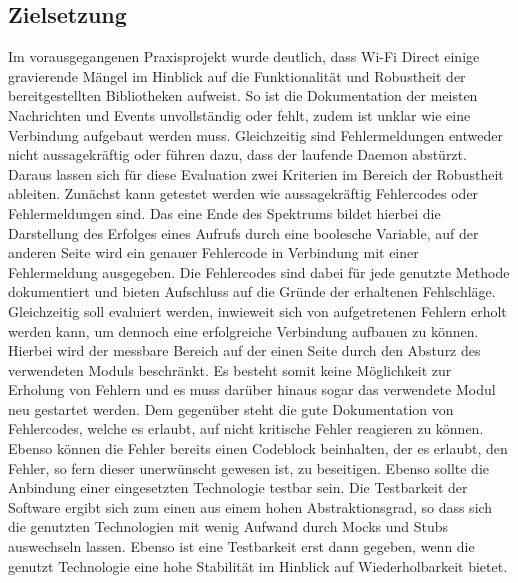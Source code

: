         \subsection{Zielsetzung}
        Im vorausgegangenen Praxisprojekt wurde deutlich, dass Wi-Fi Direct einige \linebreak gravierende Mängel im Hinblick auf die Funktionalität und Robustheit der bereitgestellten Bibliotheken aufweist. So ist die Dokumentation der meisten Nachrichten und Events unvollständig oder fehlt, zudem ist unklar wie eine Verbindung aufgebaut werden muss. Gleichzeitig sind Fehlermeldungen entweder nicht aussagekräftig oder führen dazu, dass der laufende Daemon abstürzt.
        Daraus lassen sich für diese Evaluation zwei Kriterien im Bereich der Robustheit ableiten.
        Zunächst kann getestet werden wie aussagekräftig Fehlercodes oder Fehlermeldungen sind.
        Das eine Ende des Spektrums bildet hierbei die Darstellung des Erfolges eines Aufrufs durch eine boolesche Variable, auf der anderen Seite wird ein genauer Fehlercode in Verbindung mit einer Fehlermeldung ausgegeben. Die Fehlercodes sind dabei für jede genutzte Methode dokumentiert und bieten Aufschluss auf die Gründe der erhaltenen Fehlschläge. 
        Gleichzeitig soll evaluiert werden, inwieweit sich von aufgetretenen Fehlern erholt werden kann, um dennoch eine erfolgreiche Verbindung aufbauen zu können. Hierbei wird der messbare Bereich auf der einen Seite durch den Absturz des verwendeten Moduls beschränkt. Es besteht somit keine Möglichkeit zur Erholung von Fehlern und es muss darüber hinaus sogar das verwendete Modul neu gestartet werden. Dem gegenüber steht die gute Dokumentation von Fehlercodes, welche es erlaubt, auf nicht kritische Fehler reagieren zu können. Ebenso können die Fehler bereits einen Codeblock beinhalten, der es erlaubt, den Fehler, so fern dieser unerwünscht gewesen ist, zu beseitigen.
        Ebenso sollte die Anbindung einer eingesetzten Technologie testbar sein. Die Testbarkeit der Software ergibt sich zum einen aus einem hohen Abstraktionsgrad, so dass sich die genutzten Technologien mit wenig Aufwand durch Mocks und Stubs auswechseln lassen. Ebenso ist eine Testbarkeit erst dann gegeben, wenn die genutzt Technologie eine hohe Stabilität im Hinblick auf Wiederholbarkeit bietet.
        
